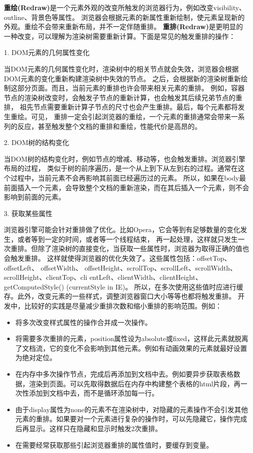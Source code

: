 \documentclass{book}
\begin{document}
\textbf{重绘(Redraw)}是一个元素外观的改变所触发的浏览器行为，例如改变visibility、outline、背景色等属性。
浏览器会根据元素的新属性重新绘制，使元素呈现新的外观。重绘不会带来重新布局，并不一定伴随重排。
\textbf{重排(Redraw)}是更明显的一种改变，可以理解为渲染树需要重新计算。下面是常见的触发重排的操作：

1. DOM元素的几何属性变化

当DOM元素的几何属性变化时，渲染树中的相关节点就会失效，浏览器会根据DOM元素的变化重新构建渲染树中失效的节点。
之后，会根据新的渲染树重新绘制这部分页面。而且，当前元素的重排也许会带来相关元素的重排。
例如，容器节点的渲染树改变时，会触发子节点的重新计算，也会触发其后续兄弟节点的重排，
祖先节点需要重新计算子节点的尺寸也会产生重排。最后，每个元素都将发生重绘。可见，
重排一定会引起浏览器的重绘，一个元素的重排通常会带来一系列的反应，甚至触发整个文档的重排和重绘，性能代价是高昂的。

2. DOM树的结构变化

当DOM树的结构变化时，例如节点的增减、移动等，也会触发重排。浏览器引擎布局的过程，
类似于树的前序遍历，是一个从上到下从左到右的过程。通常在这个过程中，当前元素不会再影响其前面已经遍历过的元素。
所以，如果在body最前面插入一个元素，会导致整个文档的重新渲染，而在其后插入一个元素，则不会影响到前面的元素。

3. 获取某些属性

浏览器引擎可能会针对重排做了优化。比如Opera，它会等到有足够数量的变化发生，或者等到一定的时间，或者等一个线程结束，
再一起处理，这样就只发生一次重排。但除了渲染树的直接变化，当获取一些属性时，浏览器为取得正确的值也会触发重排。
这样就使得浏览器的优化失效了。这些属性包括：offsetTop、offsetLeft、 offsetWidth、
offsetHeight、scrollTop、scrollLeft、scrollWidth、scrollHeight、clientTop、cli
entLeft、clientWidth、clientHeight、getComputedStyle() (currentStyle in IE)。
所以，在多次使用这些值时应进行缓存。此外，改变元素的一些样式，调整浏览器窗口大小等等也都将触发重排。
开发中，比较好的实践是尽量减少重排次数和缩小重排的影响范围。例如：

\begin{itemize}
\item{将多次改变样式属性的操作合并成一次操作。}
\item{将需要多次重排的元素，position属性设为absolute或fixed，这样此元素就脱离了文档流，它的变化不会影响到其他元素。例如有动画效果的元素就最好设置为绝对定位。}
\item{在内存中多次操作节点，完成后再添加到文档中去。例如要异步获取表格数据，渲染到页面。可以先取得数据后在内存中构建整个表格的html片段，再一次性添加到文档中去，而不是循环添加每一行。}
\item{由于display属性为none的元素不在渲染树中，对隐藏的元素操作不会引发其他元素的重排。如果要对一个元素进行复杂的操作时，可以先隐藏它，操作完成后再显示。这样只在隐藏和显示时触发2次重排。}
\item{在需要经常获取那些引起浏览器重排的属性值时，要缓存到变量。}
\end{itemize}
\end{document}
